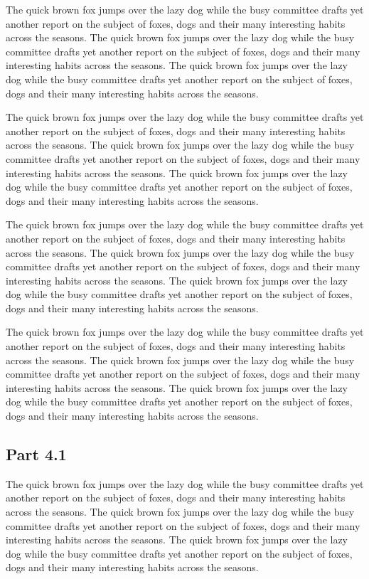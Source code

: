 \documentclass{article}
\begin{document}
The quick brown fox jumps over the lazy dog while the busy committee drafts yet another report on the subject of foxes, dogs and their many interesting habits across the seasons. The quick brown fox jumps over the lazy dog while the busy committee drafts yet another report on the subject of foxes, dogs and their many interesting habits across the seasons. The quick brown fox jumps over the lazy dog while the busy committee drafts yet another report on the subject of foxes, dogs and their many interesting habits across the seasons. 

The quick brown fox jumps over the lazy dog while the busy committee drafts yet another report on the subject of foxes, dogs and their many interesting habits across the seasons. The quick brown fox jumps over the lazy dog while the busy committee drafts yet another report on the subject of foxes, dogs and their many interesting habits across the seasons. The quick brown fox jumps over the lazy dog while the busy committee drafts yet another report on the subject of foxes, dogs and their many interesting habits across the seasons. 

The quick brown fox jumps over the lazy dog while the busy committee drafts yet another report on the subject of foxes, dogs and their many interesting habits across the seasons. The quick brown fox jumps over the lazy dog while the busy committee drafts yet another report on the subject of foxes, dogs and their many interesting habits across the seasons. The quick brown fox jumps over the lazy dog while the busy committee drafts yet another report on the subject of foxes, dogs and their many interesting habits across the seasons. 

The quick brown fox jumps over the lazy dog while the busy committee drafts yet another report on the subject of foxes, dogs and their many interesting habits across the seasons. The quick brown fox jumps over the lazy dog while the busy committee drafts yet another report on the subject of foxes, dogs and their many interesting habits across the seasons. The quick brown fox jumps over the lazy dog while the busy committee drafts yet another report on the subject of foxes, dogs and their many interesting habits across the seasons. 

\subsection{Part 4.1}
The quick brown fox jumps over the lazy dog while the busy committee drafts yet another report on the subject of foxes, dogs and their many interesting habits across the seasons. The quick brown fox jumps over the lazy dog while the busy committee drafts yet another report on the subject of foxes, dogs and their many interesting habits across the seasons. The quick brown fox jumps over the lazy dog while the busy committee drafts yet another report on the subject of foxes, dogs and their many interesting habits across the seasons. 
\end{document}
